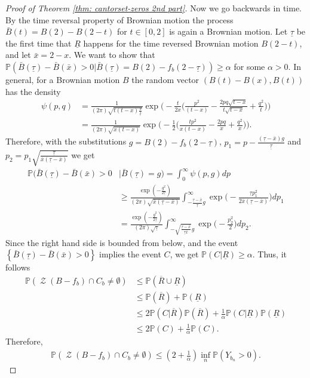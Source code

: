 \documentclass[11pt,reqno]{amsart}
\theoremstyle{plain}
\theoremstyle{definition}
\theoremstyle{remark}
\begin{document}
\begin{proof}[Proof of Theorem \ref{thm: cantorset-zeros 2nd part}]
Now we go backwards in time. By the time reversal property of Brownian motion the process $\bar{B}(t)= B(2) - B(2-t)$ for $t\in[0,2]$ is again a Brownian motion. Let $\underline{\tau}$ be the first time that $\underline{R}$ happens for the time reversed Brownian motion $B(2-t)$, and let $\bar{x}=2-x$. We want to show that $\mathbb{P}(\bar{B}(\underline{\tau})-\bar{B}(\bar{x})>0|\bar{B}(\underline{\tau})=B(2)-f_{b}(2-\underline{\tau})) \geq \alpha$ for some $\alpha > 0$. In general, for a Brownian motion $B$ the random vector $(B(t)-B(x), B(t))$ has the density
\begin{align*}
\psi(p,q) &= \frac{1}{(2\pi)\sqrt{t(t-x)\frac{x}{t}}}\exp\Big(-\frac{t}{2x}\big(\frac{p^2}{(t-x)} -\frac{2pq\sqrt{t-x}}{t\sqrt{t-x}} + \frac{q^2}{t}\big)\Big) \\
&= \frac{1}{(2\pi)\sqrt{x(t-x)}}\exp\Big(-\frac{1}{2}\big(\frac{tp^2}{x(t-x)} -\frac{2pq}{x} + \frac{q^2}{x}\big)\Big).
\end{align*}
Therefore, with the substitutions $g=B(2)-f_{b}(2-\underline{\tau})$, $p_1 = p - \frac{(\underline{\tau}-\bar{x})g}{\underline{\tau}}$ and $p_2= p_1 \sqrt{\frac{\underline{\tau}}{\bar{x}(\underline{\tau}-\bar{x})}}$ we get
\begin{align*}
 \mathbb{P}(\bar{B}(\underline{\tau})-\bar{B}(\bar{x})>0&|\bar{B}(\underline{\tau})=g)  = \int^{\infty}_0\psi(p,g)dp \\
&\geq\frac{\exp(-\frac{g^2}{2\underline{\tau}})}{(2\pi)\sqrt{\bar{x}(\underline{\tau}-\bar{x})}}\int^{\infty}_{-\frac{\underline{\tau}-\bar{x}}{\underline{\tau}}g}\exp\Big(-\frac{\underline{\tau}p_1^2}{2\bar{x}(\underline{\tau}-\bar{x})}\Big) dp_1 \\
& = \frac{\exp(-\frac{g^2}{2\underline{\tau}})}{(2\pi)\sqrt{\underline{\tau}}}\int^{\infty}_{-\sqrt{\frac{\underline{\tau}-\bar{x}}{\underline{\tau}\bar{x}}}g}\exp\Big(-\frac{p_2^2}{2}\Big)dp_2.
\end{align*}
Since the right hand side is bounded from below, and the event \\$\left\lbrace \bar{B}(\underline{\tau})-\bar{B}(\bar{x})>0 \right\rbrace $ implies the event $C$, we get $\mathbb{P}(C |\underline{R}) \geq \alpha$.
Thus, it follows
\begin{align*}
\mathbb{P}(\operatorname{\mathcal{Z}}(B-f_b) \cap C_{b} \neq \emptyset) &\leq \mathbb{P}(\overline{R}\cup\underline{R}) \\
&\leq \mathbb{P}(\overline{R})+\mathbb{P}(\underline{R}) \\
&\leq 2 \mathbb{P}(C |\overline{R})\mathbb{P}(\overline{R}) + \frac{1}{\alpha}\mathbb{P}(C |\underline{R})\mathbb{P}(\underline{R}) \\
&\leq 2 \mathbb{P}(C) + \frac{1}{\alpha}\mathbb{P}(C).
\end{align*}
Therefore,
\begin{align}\label{eq: approximation of probabilities_2}
\mathbb{P}(\operatorname{\mathcal{Z}}(B-f_b) \cap C_{b} \neq \emptyset) \leq
(2+\frac{1}{\alpha})
\inf_n
 \mathbb{P}(Y_{b_n}>0).
\end{align}


\end{proof}
\end{document}
